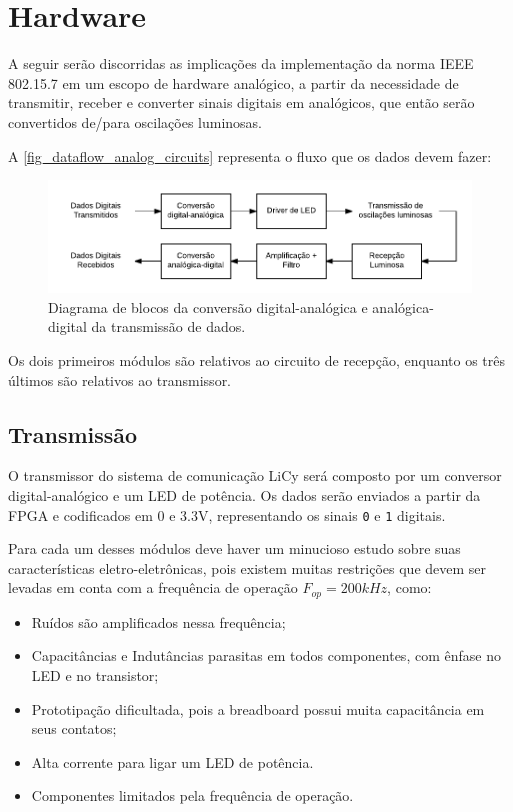 	
	
	\section{Hardware}\label{sec-hardware}
	
	A seguir serão discorridas as implicações da implementação da norma IEEE 802.15.7 em um escopo de hardware analógico, a partir da necessidade de transmitir, receber e converter sinais digitais em analógicos, que então serão convertidos de/para oscilações luminosas.
	
	A \autoref{fig_dataflow_analog_circuits}  representa o fluxo que os dados devem fazer:
	
	\begin{figure}[htb]
		\caption{\label{fig_dataflow_analog_circuits} Diagrama de blocos da conversão digital-analógica e analógica-digital da transmissão de dados.}
		\centering
		\includegraphics[width=0.6\textheight]{circuits/dataflow_analog_circuits.pdf}
	\end{figure}
	
	Os dois primeiros módulos são relativos ao circuito de recepção, enquanto os três últimos são relativos ao transmissor.
	
	\subsection{Transmissão}
	
	O transmissor do sistema de comunicação LiCy será composto por um conversor digital-analógico e um LED de potência. Os dados serão enviados a partir da FPGA e codificados em 0 e 3.3V, representando os sinais \texttt{0} e \texttt{1} digitais. 
	
	Para cada um desses módulos deve haver um minucioso estudo sobre suas características eletro-eletrônicas, pois existem muitas restrições que devem ser levadas em conta com a frequência de operação $F_{op} = 200 kHz$, como:
	
	\begin{itemize}  
		\item Ruídos são amplificados nessa frequência;
		\item Capacitâncias e Indutâncias parasitas em todos componentes, com ênfase no LED e no transistor;
		\item Prototipação dificultada, pois a breadboard possui muita capacitância em seus contatos;
		\item Alta corrente para ligar um LED de potência.
		\item Componentes limitados pela frequência de operação.
	\end{itemize}
	
